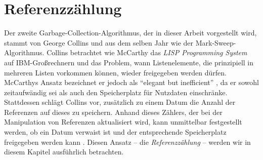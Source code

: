 \chapter{Referenzzählung}
\label{cha:reference-counting}
Der zweite Garbage-Collection-Algorithmus, der in dieser Arbeit vorgestellt wird, stammt von George Collins und aus dem selben Jahr wie der Mark-Sweep-Algorithmus.
Collins betrachtet wie McCarthy das \textit{LISP Programming System} auf IBM-Großrechnern und das Problem, wann Listenelemente, die prinzipiell in mehreren Listen vorkommen können, wieder freigegeben werden dürfen.
McCarthys Ansatz bezeichnet er jedoch als \enquote{elegant but inefficient} \cite[S. 655]{collins1960}, da er sowohl zeitaufwändig sei als auch den Speicherplatz für Nutzdaten einschränke.
Stattdessen schlägt Collins vor, zusätzlich zu einem Datum die Anzahl der Referenzen auf dieses zu speichern.
Anhand dieses Zählers, der bei der Manipulation von Referenzen aktualisiert wird, kann unmittelbar festgestellt werden, ob ein Datum verwaist ist und der entsprechende Speicherplatz freigegeben werden kann \cite[S. 656f]{collins1960}.
Diesen Ansatz -- die \textit{Referenzzählung} -- werden wir in diesem Kapitel ausführlich betrachten.